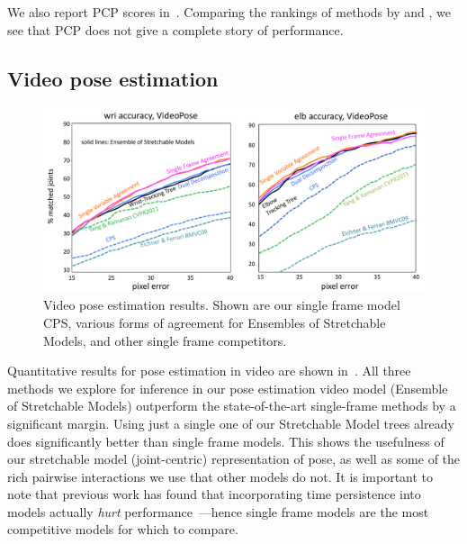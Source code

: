 We also report PCP scores in~.  Comparing the rankings of 
methods by  and , we see 
that PCP does not give a complete story of performance.

\subsection{Video pose estimation}
\begin{figure}[tb]
\begin{center}
\includegraphics[width=1.00\textwidth]{figs/results-vpose.pdf}
\caption[Video pose estimation results.]{Video pose estimation results.  Shown 
are our single frame model CPS, various forms of agreement for Ensembles of 
Stretchable Models, and other single frame competitors.}
\label{fig:results-vpose}
\end{center}
\end{figure}

Quantitative results for pose estimation in video are shown 
in~.  All three methods we explore for inference in our 
pose estimation video model (Ensemble of Stretchable Models) outperform the 
state-of-the-art single-frame methods by a significant margin.  Using just a 
single one of our Stretchable Model trees already does significantly better 
than single frame models.  This shows the usefulness of our stretchable model 
(joint-centric) representation of pose, as well as some of the rich pairwise 
interactions we use that other models do not.  It is important to note that 
previous work has found that incorporating time persistence into models 
actually {\em hurt } performance~\citep{posesearch,weisssapp10}---hence single 
frame models are the most competitive models for which to compare.

